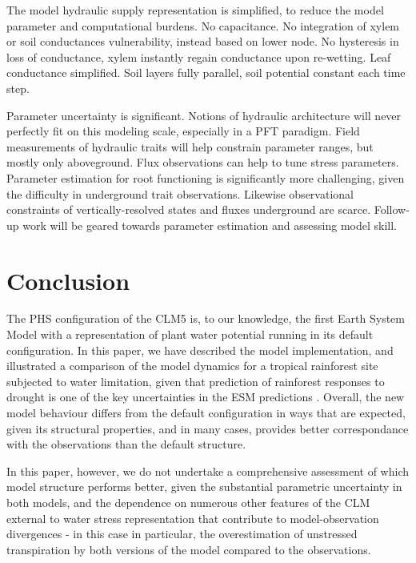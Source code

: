 \documentclass[draft,linenumbers]{agujournal}
\begin{document}
    The model hydraulic supply representation is simplified, to reduce the model parameter and computational burdens.
    No capacitance.
    No integration of xylem or soil conductances vulnerability, instead based on lower node.
    No hysteresis in loss of conductance, xylem instantly regain conductance upon re-wetting.
    Leaf conductance simplified.
    Soil layers fully parallel, soil potential constant each time step.
    
    Parameter uncertainty is significant.
    Notions of hydraulic architecture will never perfectly fit on this modeling scale, especially in a PFT paradigm.
    Field measurements of hydraulic traits will help constrain parameter ranges, but mostly only aboveground.
    Flux observations can help to tune stress parameters.
    Parameter estimation for root functioning is significantly more challenging, given the difficulty in underground trait observations.
    Likewise observational constraints of vertically-resolved states and fluxes underground are scarce.
    Follow-up work will be geared towards parameter estimation and assessing model skill.

\section{Conclusion}

    The PHS configuration of the CLM5 is, to our knowledge, the first Earth System Model with a representation of plant water potential running in its default configuration. In this paper, we have described the model implementation, and illustrated a comparison of the model dynamics for a tropical rainforest site subjected to water limitation, given that prediction of rainforest responses to drought is one of the key uncertainties in the ESM predictions \citep{huntingford2013}. Overall, the new model behaviour differs from the default configuration in ways that are expected, given its structural properties, and in many cases, provides better correspondance with the observations than the default structure. 
    
    In this paper, however, we do not undertake a comprehensive assessment of which model structure performs better, given the substantial parametric uncertainty in both models, and the dependence on numerous other features of the CLM external to water stress representation that contribute to model-observation divergences - in this case in particular, the overestimation of unstressed transpiration by both versions of the model compared to the observations. 
    
\end{document}
